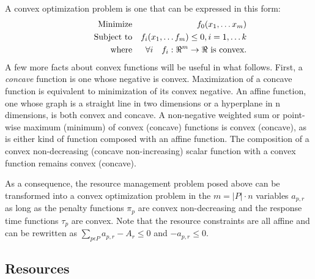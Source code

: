 A convex optimization problem is one that can be expressed in this form:
\begin{eqnarray*}
& \makebox[1in][r]{Minimize}   & f_0(x_1,\ldots x_m)                              \\
& \makebox[1in][r]{Subject to} & f_i(x_1,\ldots f_m) \leq 0, i = 1,\ldots k        \\
& \makebox[1in][r]{where}      & \forall i \quad f_i:\Re^m \rightarrow \Re \mbox{ is convex.}
\end{eqnarray*}
A few more facts about convex functions will be useful in what follows.
First, a \emph{concave} function is one whose negative is convex.
Maximization of a concave function is equivalent to minimization of its convex negative.
An affine function, one whose graph is a straight line in two dimensions or a hyperplane in n dimensions,
is both convex and concave.  A non-negative weighted sum or point-wise maximum (minimum) of convex (concave) functions is convex (concave), as is either kind of function composed with an affine function.  The composition of a convex non-decreasing (concave non-increasing) scalar function with a convex function remains convex (concave).

As a consequence, the resource management problem posed above can be transformed into a convex optimization problem in the $m = |P|\cdot n$ variables $a_{p,r}$ as long as the penalty functions $\pi_p$ are convex non-decreasing and the response time functions $\tau_p$ are convex.
Note that the resource constraints are all affine and can be rewritten as
$\sum_{p\epsilon P} a_{p,r} - A_r \leq 0$ and $-a_{p,r} \leq 0$.

\subsection*{Resources}


